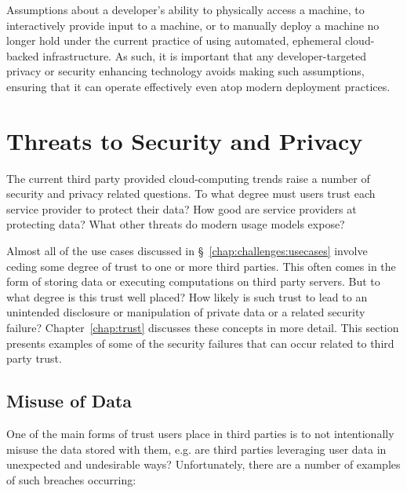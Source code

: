 Assumptions about a developer's ability to physically access a
machine, to interactively provide input to a machine, or to manually
deploy a machine no longer hold under the current practice of using
automated, ephemeral cloud-backed infrastructure. As such, it is
important that any developer-targeted privacy or security enhancing
technology avoids making such assumptions, ensuring that it can
operate effectively even atop modern deployment practices.

\section{Threats to Security and Privacy}
\label{chap:challenges:threats}

The current third party provided cloud-computing trends raise a number
of security and privacy related questions. To what degree must users
trust each service provider to protect their data? How good are
service providers at protecting data? What other threats do modern
usage models expose?

Almost all of the use cases discussed in
\S~\ref{chap:challenges:usecases} involve ceding some degree of trust
to one or more third parties. This often comes in the form of storing
data or executing computations on third party servers. But to what
degree is this trust well placed? How likely is such trust to lead to
an unintended disclosure or manipulation of private data or a related
security failure? Chapter~\ref{chap:trust} discusses these concepts in
more detail. This section presents examples of some of the security
failures that can occur related to third party trust.

\subsection{Misuse of Data}

One of the main forms of trust users place in third parties is to not
intentionally misuse the data stored with them, e.g. are third parties
leveraging user data in unexpected and undesirable ways?
Unfortunately, there are a number of examples of such breaches
occurring:

